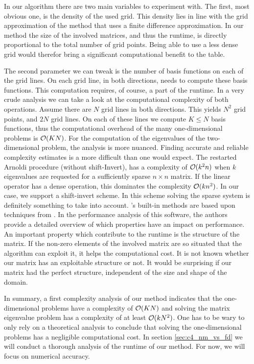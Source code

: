 In our algorithm there are two main variables to experiment with. The first, most obvious one, is the density of the used grid. This density lies in line with the grid approximation of the method that uses a finite difference approximation. In our method the size of the involved matrices, and thus the runtime, is directly proportional to the total number of grid points. Being able to use a less dense grid would therefor bring a significant computational benefit to the table.

The second parameter we can tweak is the number of basis functions on each of the grid lines. On each grid line, in both directions, \matslise needs to compute these basis functions. This computation requires, of course, a part of the runtime. In a very crude analysis we can take a look at the computational complexity of both operations. Assume there are $N$ grid lines in both directions. This yields $N^2$ grid points, and $2N$ grid lines. On each of these lines we compute $K \leq N$ basis functions, thus the computational overhead of the many one-dimensional problems is $\operatorname{\mathcal{O}}(K N)$. For the computation of the eigenvalues of the two-dimensional problem, the analysis is more nuanced. Finding accurate and reliable complexity estimates is a more difficult than one would expect. The restarted Arnoldi procedure (without shift-Invert), has a complexity of $\operatorname{\mathcal{O}}(k^2 n)$ when $k$ eigenvalues are requested for a sufficiently sparse $n \times n$ matrix\cite{lee_k2n_2009}. If the linear operator has a dense operation, this dominates the complexity $\operatorname{\mathcal{O}}(k n^2)$. In our case, we support a shift-invert scheme. In this scheme solving the sparse system is definitely something to take into account. \Eigen's built-in methods are based upon techniques from \superlu{}\cite{demmel_supernodal_1999,li_overview_2005}. In the performance analysis of this software, the authors provide a detailed overview of which properties have an impact on performance. An important property which contribute to the runtime is the structure of the matrix. If the non-zero elements of the involved matrix are so situated that the algorithm can exploit it, it helps the computational cost. It is not known whether our matrix has an exploitable structure or not. It would be surprising if our matrix had the perfect structure, independent of the size and shape of the domain.

In summary, a first complexity analysis of our method indicates that the one-dimensional problems have a complexity of $\operatorname{\mathcal{O}}(K N)$ and solving the matrix eigenvalue problem has a complexity of at least $\operatorname{\mathcal{O}}(k N^2)$. One has to be wary to only rely on a theoretical analysis to conclude that solving the one-dimensional problems has a negligible computational cost. In section \ref{sec:c4_nm_vs_fd} we will conduct a thorough analysis of the runtime of our method. For now, we will focus on numerical accuracy.

